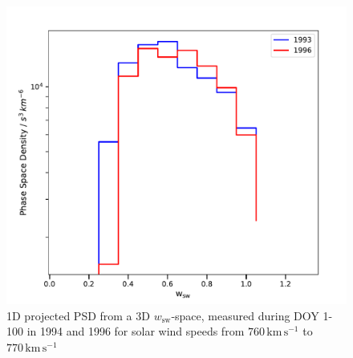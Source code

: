 \begin{figure}[h]
	\includegraphics[width=.8\textwidth]{Figures/1D.pdf}
	\centering
	\caption{1D projected PSD from a 3D $w_\mathrm{sw}$-space, measured during DOY 1-100 in 1994 and 1996 for solar wind speeds from $760 \, \mathrm{km\,s^{-1}}$ to $770 \, \mathrm{km\,s^{-1}}$}
	\label{fig:1d}
\end{figure}